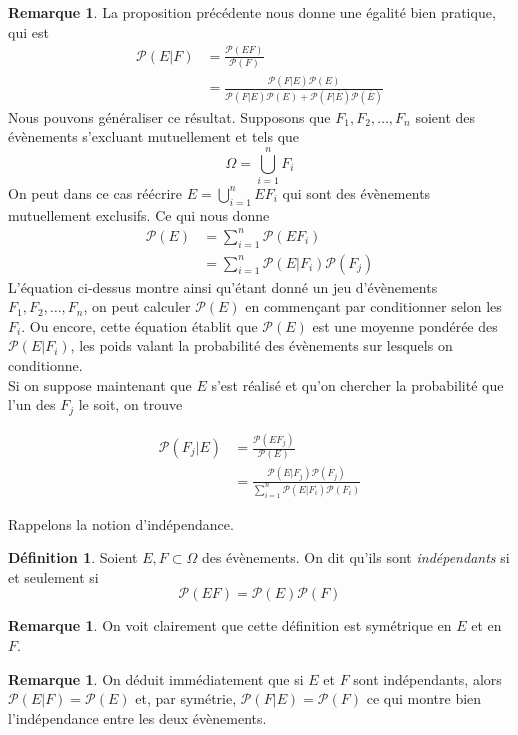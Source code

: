 \documentclass[a4paper,12pt]{report}
\theoremstyle{definition}
\renewcommand{\(}{\left(}
\renewcommand{\)}{\right)}
\renewcommand{\P}{\mathcal{P}}
\renewcommand{\bar}{\overline}
\newtheorem{defn}[thm]{Définition}
\newtheorem{rmk}[thm]{Remarque}
\begin{document}
    \begin{rmk}
        La proposition précédente nous donne une égalité bien pratique, qui est 
        \begin{align*}
            \P(E|F) &= \frac{\P(EF)}{\P(F)}\\
            &= \frac{\P(F|E)\P(E)}{\P(F|E)\P(E) + \P(F|\bar{E})\P(\bar{E})}
        \end{align*}
        Nous pouvons généraliser ce résultat. Supposons que $F_1,F_2, \ldots, F_n$ soient des évènements s'excluant mutuellement et tels que 
        $$\Omega = \bigcup_{i = 1}^n F_i$$
        On peut dans ce cas réécrire $E = \bigcup_{i = 1}^n EF_i$ qui sont des évènements mutuellement exclusifs. Ce qui nous donne 
        \begin{align*}
            \P(E) &= \sum_{i = 1}^n\P(EF_i)\\
            &= \sum_{i = 1}^n \P(E|F_i)\P(F_j)
        \end{align*}
        L'équation ci-dessus montre ainsi qu'étant donné un jeu d'évènements $F_1,F_2, \ldots, F_n$, on peut calculer $\P(E)$ en commençant par conditionner selon les $F_i$. Ou encore, cette équation établit que $\P(E)$ est une moyenne pondérée des $\P(E|F_i)$, les poids valant la probabilité des évènements sur lesquels on conditionne.\\
        Si on suppose maintenant que $E$ s'est réalisé et qu'on chercher la probabilité que l'un des $F_j$ le soit, on trouve
        
        \begin{align*}
            \P(F_j|E) &= \frac{\P(EF_j)}{\P(E)}\\
            &= \frac{\P(E|F_j)\P(F_j)}{\sum_{i = 1}^n \P(E|F_i)\P(F_i)}
        \end{align*}
    \end{rmk}
    
    Rappelons la notion d'indépendance.
    
    \begin{leftbar}
    \begin{defn}
        Soient $E, F\subset \Omega$ des évènements. On dit qu'ils sont \textit{indépendants} si et seulement si
        $$\P(EF) = \P(E)\P(F)$$
    \end{defn}
    \end{leftbar}
    
    \begin{rmk}
        On voit clairement que cette définition est symétrique en $E$ et en $F$.
    \end{rmk}
    \begin{rmk}
        On déduit immédiatement que si $E$ et $F$ sont indépendants, alors $\P(E|F) = \P(E)$ et, par symétrie, $\P(F|E) = \P(F)$ ce qui montre bien l'indépendance entre les deux évènements.
    \end{rmk}
    
\end{document}
